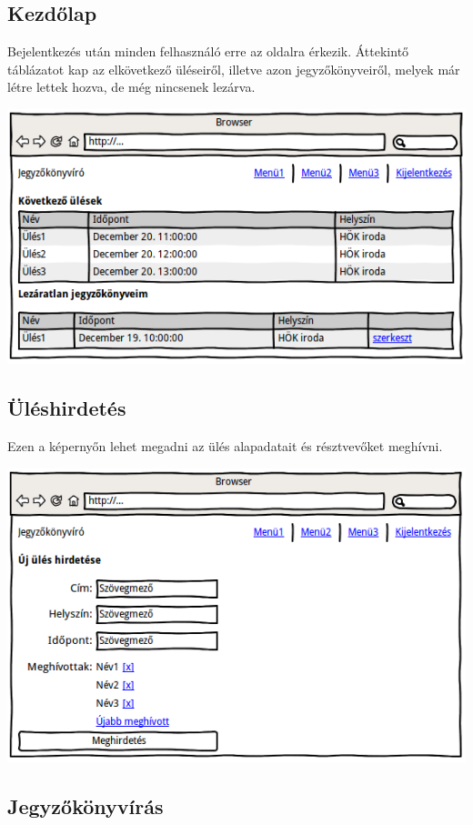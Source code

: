 \documentclass[a4paper,12pt,oneside]{report}
\begin{document}
\subsection{Kezdőlap}

Bejelentkezés után minden felhasználó erre az oldalra érkezik. Áttekintő táblázatot kap az elkövetkező üléseiről, illetve azon jegyzőkönyveiről, melyek már létre lettek hozva, de még nincsenek lezárva.

\includegraphics[width=\textwidth]{wireframe-kezdolap}

\subsection{Üléshirdetés}

Ezen a képernyőn lehet megadni az ülés alapadatait és résztvevőket meghívni.

\includegraphics[width=\textwidth]{wireframe-uleshirdetes}

\subsection{Jegyzőkönyvírás}
\end{document}
